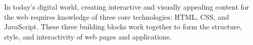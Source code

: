 \documentclass{article}
\begin{document}
\begin{enumerate}[leftmargin=1.2cm, itemsep=8pt]
\begin{itemize}[leftmargin=0.8cm, itemsep=6pt]
        \end{itemize}

\end{enumerate}

\vspace{0.25cm}


\pagebreak

\label{sec:introduction}

\maketitle
\vspace{-0.6cm}

In today's digital world, creating interactive and visually appealing content for the web requires
knowledge of three core technologies: HTML, CSS, and JavaScript.
These three building blocks work together to form the structure, style, and interactivity of web pages and
applications.

\vspace{0.35cm}
\end{document}
